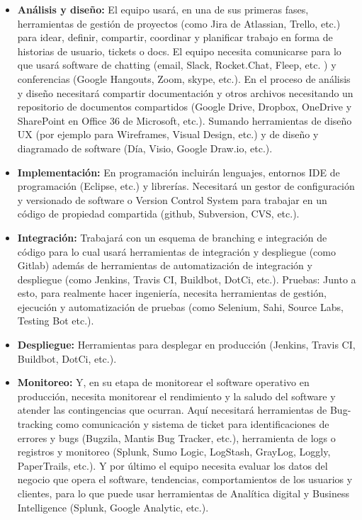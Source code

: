 \begin{itemize}

\item \textbf{Análisis y diseño:} El equipo usará, en una de sus primeras fases, herramientas de gestión de proyectos (como Jira de Atlassian, Trello, etc.) para idear, definir, compartir, coordinar y planificar trabajo en forma de historias de usuario, tickets o docs. El equipo necesita comunicarse para lo que usará software de chatting (email, Slack, Rocket.Chat, Fleep, etc. ) y conferencias (Google Hangouts, Zoom, skype, etc.). En el proceso de análisis y diseño necesitará compartir documentación y otros archivos necesitando un repositorio de documentos compartidos (Google Drive, Dropbox, OneDrive y SharePoint en Office 36 de Microsoft, etc.). Sumando herramientas de diseño UX (por ejemplo para Wireframes, Visual Design, etc.) y de diseño y diagramado de software (Día, Visio, Google Draw.io, etc.). 

\item \textbf{Implementación:} En programación incluirán lenguajes, entornos IDE de programación (Eclipse, etc.) y librerías. Necesitará un gestor de configuración y versionado de software o Version Control System para trabajar en un código de propiedad compartida (github, Subversion, CVS, etc.). 

\item \textbf{Integración:} Trabajará con un esquema de branching e integración de código para lo cual usará herramientas de integración y despliegue (como Gitlab) además de herramientas de automatización de integración y despliegue (como Jenkins, Travis CI, Buildbot, DotCi, etc.). 
Pruebas: Junto a esto, para realmente hacer ingeniería, necesita herramientas de gestión,  ejecución y automatización de pruebas (como Selenium, Sahi, Source Labs, Testing Bot etc.). 

\item \textbf{Despliegue:} Herramientas para desplegar en producción (Jenkins, Travis CI, Buildbot, DotCi, etc.). 

\item \textbf{Monitoreo:} Y, en su etapa de monitorear el software operativo en producción, necesita monitorear el rendimiento y la saludo del software y atender las contingencias que ocurran. Aquí necesitará herramientas de Bug-tracking como comunicación y sistema de ticket para identificaciones de errores y bugs (Bugzila, Mantis Bug Tracker, etc.), herramienta de logs o  registros y monitoreo (Splunk, Sumo Logic, LogStash, GrayLog, Loggly, PaperTrails, etc.). Y por último el equipo necesita evaluar los datos del negocio que opera el software, tendencias, comportamientos de los usuarios y clientes, para lo que puede usar herramientas de Analítica digital y Business Intelligence (Splunk, Google Analytic, etc.).

\end{itemize}

